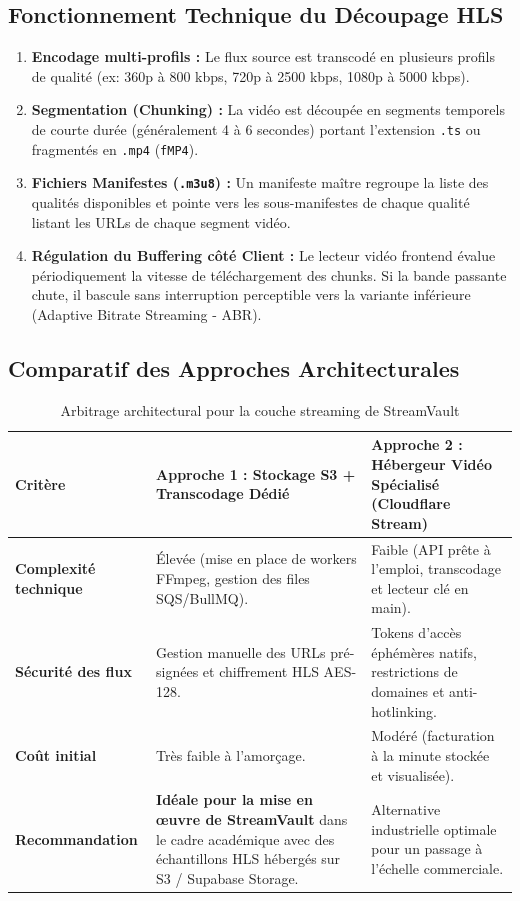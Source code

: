 \documentclass[11pt,a4paper]{article}
\begin{document}
\subsection{Fonctionnement Technique du Découpage HLS}
\begin{enumerate}
    \item \textbf{Encodage multi-profils :} Le flux source est transcodé en plusieurs profils de qualité (ex: 360p à 800 kbps, 720p à 2500 kbps, 1080p à 5000 kbps).
    \item \textbf{Segmentation (Chunking) :} La vidéo est découpée en segments temporels de courte durée (généralement 4 à 6 secondes) portant l'extension \texttt{.ts} ou fragmentés en \texttt{.mp4} (\texttt{fMP4}).
    \item \textbf{Fichiers Manifestes (\texttt{.m3u8}) :} Un manifeste maître regroupe la liste des qualités disponibles et pointe vers les sous-manifestes de chaque qualité listant les URLs de chaque segment vidéo.
    \item \textbf{Régulation du Buffering côté Client :} Le lecteur vidéo frontend évalue périodiquement la vitesse de téléchargement des chunks. Si la bande passante chute, il bascule sans interruption perceptible vers la variante inférieure (Adaptive Bitrate Streaming - ABR).
\end{enumerate}

\subsection{Comparatif des Approches Architecturales}
\begin{table}[htbp]
\centering
\small
\renewcommand{\arraystretch}{1.2}
\begin{tabularx}{\textwidth}{p{3.2cm} X X}
\toprule
\textbf{Critère} & \textbf{Approche 1 : Stockage S3 + Transcodage Dédié} & \textbf{Approche 2 : Hébergeur Vidéo Spécialisé (Cloudflare Stream)} \\
\midrule
\textbf{Complexité technique} & Élevée (mise en place de workers FFmpeg, gestion des files SQS/BullMQ). & Faible (API prête à l'emploi, transcodage et lecteur clé en main). \\
\midrule
\textbf{Sécurité des flux} & Gestion manuelle des URLs pré-signées et chiffrement HLS AES-128. & Tokens d'accès éphémères natifs, restrictions de domaines et anti-hotlinking. \\
\midrule
\textbf{Coût initial} & Très faible à l'amorçage. & Modéré (facturation à la minute stockée et visualisée). \\
\midrule
\textbf{Recommandation} & \textbf{Idéale pour la mise en œuvre de StreamVault} dans le cadre académique avec des échantillons HLS hébergés sur S3 / Supabase Storage. & Alternative industrielle optimale pour un passage à l'échelle commerciale. \\
\bottomrule
\end{tabularx}
\caption{Arbitrage architectural pour la couche streaming de StreamVault}
\end{table}
\end{document}
